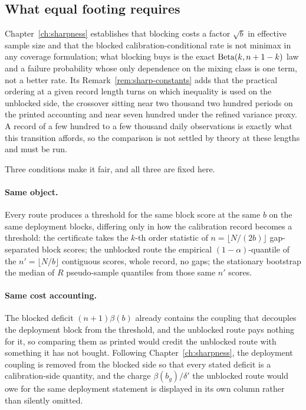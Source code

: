 \documentclass[../../../main.tex]{subfiles}
\begin{document}
\subsection{What equal footing requires}

Chapter~\ref{ch:sharpness} establishes that blocking costs a factor $\sqrt b$ in effective sample size and that the blocked calibration-conditional rate is not minimax in any coverage formulation; what blocking buys is the exact $\operatorname{Beta}(k,n+1-k)$ law and a failure probability whose only dependence on the mixing class is one term, not a better rate. Its Remark~\ref{rem:sharp-constants} adds that the practical ordering at a given record length turns on which inequality is used on the unblocked side, the crossover sitting near two thousand two hundred periods on the printed accounting and near seven hundred under the refined variance proxy. A record of a few hundred to a few thousand daily observations is exactly what this transition affords, so the comparison is not settled by theory at these lengths and must be run.

Three conditions make it fair, and all three are fixed here.

\paragraph{Same object.} Every route produces a threshold for the same block score at the same $b$ on the same deployment blocks, differing only in how the calibration record becomes a threshold: the certificate takes the $k$-th order statistic of $n=\lfloor N/(2b)\rfloor$ gap-separated block scores; the unblocked route the empirical $(1-\alpha)$-quantile of the $n'=\lfloor N/b\rfloor$ contiguous scores, whole record, no gaps; the stationary bootstrap the median of $R$ pseudo-sample quantiles from those same $n'$ scores.

\paragraph{Same cost accounting.} The blocked deficit $(n+1)\beta(b)$ already contains the coupling that decouples the deployment block from the threshold, and the unblocked route pays nothing for it, so comparing them as printed would credit the unblocked route with something it has not bought. Following Chapter~\ref{ch:sharpness}, the deployment coupling is removed from the blocked side so that every stated deficit is a calibration-side quantity, and the charge $\beta(b_g)/\delta'$ the unblocked route would owe for the same deployment statement is displayed in its own column rather than silently omitted.
\end{document}
